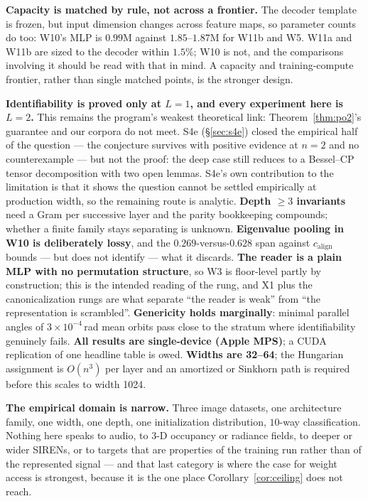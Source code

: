 \documentclass[10pt,letterpaper]{article}
\theoremstyle{definition}
\newcommand{\calign}{c_{\mathrm{align}}}
\begin{document}
\textbf{Capacity is matched by rule, not across a frontier.} The decoder template is frozen, but
input dimension changes across feature maps, so parameter counts do too: W10's MLP is $0.99$M
against $1.85$--$1.87$M for W11b and W5. W11a and W11b are sized to the decoder within $1.5\%$; W10
is not, and the comparisons involving it should be read with that in mind. A capacity and
training-compute frontier, rather than single matched points, is the stronger design.

\textbf{Identifiability is proved only at $L=1$, and every experiment here is $L=2$.} This remains
the program's weakest theoretical link: Theorem~\ref{thm:po2}'s guarantee and our corpora do not
meet. S4e (\S\ref{sec:s4e}) closed the empirical half of the question --- the conjecture survives
with positive evidence at $n=2$ and no counterexample --- but not the proof: the deep case still
reduces to a Bessel--CP tensor decomposition with two open lemmas. S4e's own contribution to the
limitation is that it shows the question cannot be settled empirically at production width, so the
remaining route is analytic. \textbf{Depth $\ge 3$ invariants} need a Gram per successive layer and the
parity bookkeeping compounds; whether a finite family stays separating is unknown.
\textbf{Eigenvalue pooling in W10 is deliberately lossy}, and the $0.269$-versus-$0.628$ span
against $\calign$ bounds --- but does not identify --- what it discards. \textbf{The reader is a
plain MLP with no permutation structure}, so W3 is floor-level partly by construction; this is the
intended reading of the rung, and X1 plus the canonicalization rungs are what separate ``the
reader is weak'' from ``the representation is scrambled''. \textbf{Genericity holds marginally}:
minimal parallel angles of $3\times10^{-4}$\,rad mean orbits pass close to the stratum where
identifiability genuinely fails. \textbf{All results are single-device (Apple MPS)}; a CUDA
replication of one headline table is owed. \textbf{Widths are 32--64}; the Hungarian assignment is
$O(n^3)$ per layer and an amortized or Sinkhorn path is required before this scales to width 1024.

\textbf{The empirical domain is narrow.} Three image datasets, one architecture family, one width,
one depth, one initialization distribution, $10$-way classification. Nothing here speaks to audio,
to 3-D occupancy or radiance fields, to deeper or wider SIRENs, or to targets that are properties of
the training run rather than of the represented signal --- and that last category is where the case
for weight access is strongest, because it is the one place Corollary~\ref{cor:ceiling} does not
reach.
\end{document}
